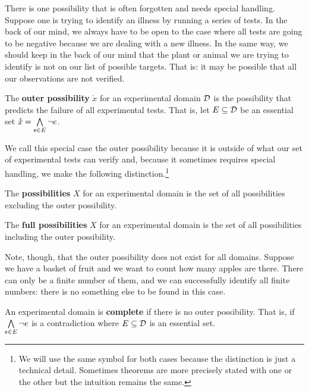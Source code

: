 \documentclass[11pt,letterpaper,fleqn]{memoir} %
\begin{document}
There is one possibility that is often forgotten and needs special handling. Suppose one is trying to identify an illness by running a series of tests. In the back of our mind, we always have to be open to the case where all tests are going to be negative because we are dealing with a new illness. In the same way, we should keep in the back of our mind that the plant or animal we are trying to identify is not on our list of possible targets. That is: it may be possible that all our observations are not verified.

\begin{mathSection}
	\begin{prop}
		The \textbf{outer possibility} $\mathring{x}$ for an experimental domain $\edomain$ is the possibility that predicts the failure of all experimental tests. That is, let $E \subseteq \edomain$ be an essential set  $\mathring{x} = \bigAND\limits_{\stmt[e] \in E} \NOT e$.
	\end{prop}
\end{mathSection}

We call this special case the outer possibility because it is outside of what our set of experimental tests can verify and, because it sometimes requires special handling, we make the following distinction.\footnote{We will use the same symbol for both cases because the distinction is just a technical detail. Sometimes theorems are more precisely stated with one or the other but the intuition remains the same.}

\begin{mathSection}
	\begin{prop}
		The \textbf{possibilities} $X$ for an experimental domain is the set of all possibilities excluding the outer possibility.
	\end{prop}
	\begin{prop}
		The \textbf{full possibilities} $X$ for an experimental domain is the set of all possibilities including the outer possibility.
	\end{prop}
\end{mathSection}

Note, though, that the outer possibility does not exist for all domains. Suppose we have a basket of fruit and we want to count how many apples are there. There can only be a finite number of them, and we can successfully identify all finite numbers: there is no something else to be found in this case.

\begin{mathSection}
	\begin{prop}
		An experimental domain is \textbf{complete} if there is no outer possibility. That is, if $\bigAND\limits_{\stmt[e] \in E} \NOT e$ is a contradiction where $E \subseteq \edomain$ is an essential set.
	\end{prop}
\end{mathSection}
\end{document}
